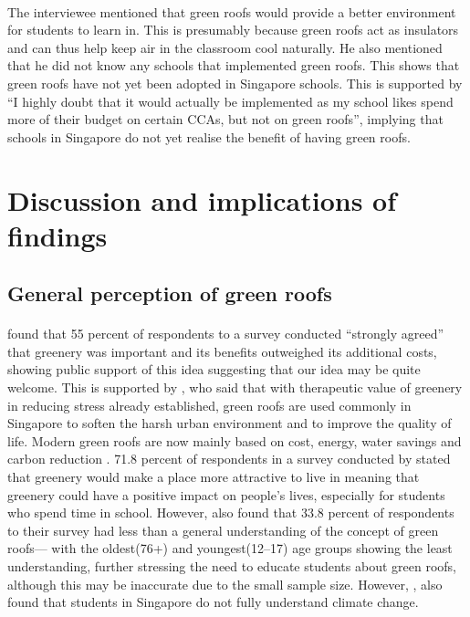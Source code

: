 \documentclass[a4paper]{article}
\begin{document}
\begin{multicols}{2}
  \paragraph{} The interviewee mentioned that green roofs would provide
  a better environment for students to learn in. This is presumably
  because green roofs act as insulators and can thus help keep air in the
  classroom cool naturally. He also mentioned that he did not know any
  schools that implemented green roofs. This shows that green roofs have
  not yet been adopted in Singapore schools. This is supported by ``I
  highly doubt that it would actually be implemented as my school likes
  spend more of their budget on certain CCAs, but not on green roofs'',
  implying that schools in Singapore do not yet realise the benefit of
  having green roofs.



  \section{Discussion and implications of findings}
  \subsection{General perception of green roofs}
  \paragraph{} \cite{CommAwareGBSyd} found that 55 percent of
  respondents to a survey conducted ``strongly agreed'' that greenery
  was important and its benefits outweighed its additional costs,
  showing public support of this idea suggesting that our idea may be
  quite welcome. This is supported by \cite{CFGRSG}, who said that with
  therapeutic value of greenery in reducing stress already established,
  green roofs are used commonly in Singapore to soften the harsh
  urban environment and to improve the quality of life. Modern green
  roofs are now mainly based on cost, energy, water savings and carbon
  reduction \parencite{CFGRSG}.  71.8 percent of respondents in a survey
  conducted by \cite{CommAwareGBSyd} stated that greenery would make
  a place more attractive to live in meaning that greenery could have
  a positive impact on people's lives, especially for students who
  spend time in school. However, \cite{GRBuildEnSave} also found that
  33.8 percent of respondents to their survey had less than a general
  understanding of the concept of green roofs--- with the oldest(76+)
  and youngest(12--17) age groups showing the least understanding,
  further stressing the need to educate students about green roofs,
  although this may be inaccurate due to the small sample size. However,
  \cite{student_carbon_footprint}, also found that students in Singapore
  do not fully understand climate change.




\end{multicols}
\end{document}
